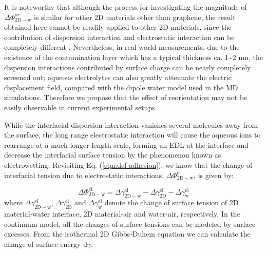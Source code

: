\documentclass[aps,prl,reprint,groupedaddress,amsmath,amssymb, showpacs]{revtex4-1}
\begin{document}
It is noteworthy that although the process for investigating the
magnitude of \(\Delta \Phi_{\mathrm{2D-w}}^{or}\) is similar for other 2D
materials other than graphene, the result obtained here cannot be
readily applied to other 2D materials, since the contribution of
dispersion interaction and electrostatic interaction can be completely
different \cite{Govind_Rajan_2016,Chow_2015}. Nevertheless, in
real-world measurements, due to the existence of the contamination
layer which has a typical thickness ca. 1\textasciitilde{}2 nm, the dispersion
interactions contributed by surface charge can be nearly completely
screened out; aqueous electrolytes can also greatly attenuate the
electric displacement field, compared with the dipole water model used
in the MD simulations. Therefore we propose that the effect of
reorientation may not be easily observable in current experimental
setups.


While the interfacial dispersion interaction vanishes several
molecules away from the surface, the long range electrostatic
interaction will cause the aqueous ions to rearrange at a much longer
length scale, forming an EDL at the interface and decrease the
interfacial surface tension by the phenomenon known as electrowetting.
Revisiting Eq. (\ref{eqn:def-adhesion}), we know that the change of
interfacial tension due to electrostatic interactions, \(\Delta
\Phi_{\mathrm{2D-w}}^{\mathrm{el}}\), is given by:

\begin{equation}
\label{eqn:Delta-Phi-el-def}
\Delta \Phi_{\mathrm{2D-w}}^{\mathrm{el}} = \Delta \gamma_{\mathrm{2D-w}}^{\mathrm{el}}
                                           -\Delta \gamma_{\mathrm{2D}}^{\mathrm{el}}
                                           -\Delta \gamma_{\mathrm{w}}^{\mathrm{el}}
\end{equation}
where \(\Delta \gamma_{\mathrm{2D-w}}^{\mathrm{el}}\), \(\Delta
\gamma_{\mathrm{2D}}^{\mathrm{el}}\) and \(\Delta
\gamma_{\mathrm{w}}^{\mathrm{el}}\) denote the change of surface
tension of 2D material-water interface, 2D material-air and
water-air, respectively. In the continuum model, all the changes of
surface tensions can be modeled by surface excesses. From the
isothermal 2D Gibbs-Duhem equation we can calculate the change of surface
energy \(\mathrm{d} \gamma\):
\end{document}
